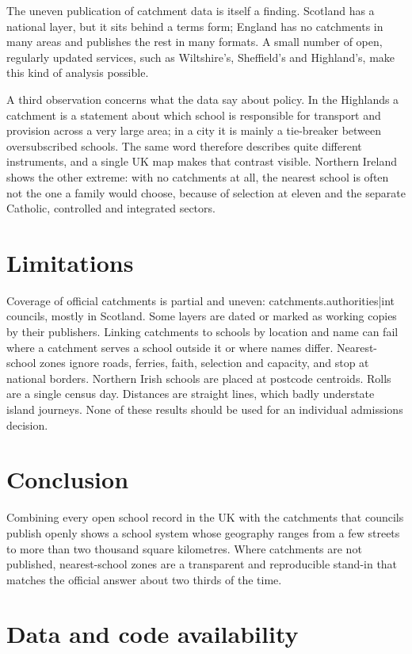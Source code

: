 \documentclass[11pt,a4paper]{article}
\begin{document}
The uneven publication of catchment data is itself a finding. Scotland has a national layer, but it sits behind a terms form; England has no catchments in many areas and publishes the rest in many formats. A small number of open, regularly updated services, such as Wiltshire's, Sheffield's and Highland's, make this kind of analysis possible.

A third observation concerns what the data say about policy. In the Highlands a catchment is a statement about which school is responsible for transport and provision across a very large area; in a city it is mainly a tie-breaker between oversubscribed schools. The same word therefore describes quite different instruments, and a single UK map makes that contrast visible. Northern Ireland shows the other extreme: with no catchments at all, the nearest school is often not the one a family would choose, because of selection at eleven and the separate Catholic, controlled and integrated sectors.

\section{Limitations}

Coverage of official catchments is partial and uneven: {{catchments.authorities|int}} councils, mostly in Scotland. Some layers are dated or marked as working copies by their publishers. Linking catchments to schools by location and name can fail where a catchment serves a school outside it or where names differ. Nearest-school zones ignore roads, ferries, faith, selection and capacity, and stop at national borders. Northern Irish schools are placed at postcode centroids. Rolls are a single census day. Distances are straight lines, which badly understate island journeys. None of these results should be used for an individual admissions decision.

\section{Conclusion}

Combining every open school record in the UK with the catchments that councils publish openly shows a school system whose geography ranges from a few streets to more than two thousand square kilometres. Where catchments are not published, nearest-school zones are a transparent and reproducible stand-in that matches the official answer about two thirds of the time.

\section*{Data and code availability}
\end{document}
